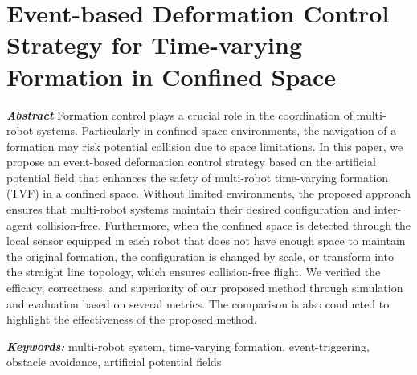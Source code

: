 \chapter{Event-based Deformation Control Strategy for Time-varying Formation in Confined Space}\label{paper2}

\vspace{1cm}

\noindent\textit{\textbf{Abstract}}
Formation control plays a crucial role in the coordination of multi-robot systems. Particularly in confined space environments, the navigation of a formation may risk potential collision due to space limitations. In this paper, we propose an event-based deformation control strategy based on the artificial potential field that enhances the safety of multi-robot time-varying formation (TVF) in a confined space. Without limited environments, the proposed approach ensures that multi-robot systems maintain their desired configuration and inter-agent collision-free. Furthermore, when the confined space is detected through the local sensor equipped in each robot that does not have enough space to maintain the original formation, the configuration is changed by scale, or transform into the straight line topology, which ensures collision-free flight. We verified the efficacy, correctness, and superiority of our proposed method through simulation and evaluation based on several metrics. The comparison is also conducted to highlight the effectiveness of the proposed method.

\noindent\textbf{\textit{Keywords:}}
multi-robot system, time-varying formation, event-triggering, obstacle avoidance, artificial potential fields







